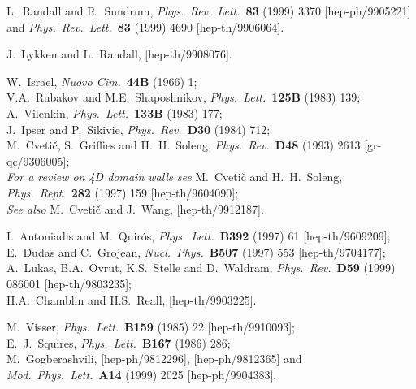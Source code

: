 \documentclass[a4paper,12pt]{article}
\begin{document}
\begin{thebibliography}{99}
L.~Randall and R.~Sundrum,
{\it Phys.\ Rev.\ Lett.}\  {\bf 83} (1999) 3370
[hep-ph/9905221]
and
{\it Phys.\ Rev.\ Lett.}\  {\bf 83} (1999) 4690
[hep-th/9906064].

J.~Lykken and L.~Randall,
[hep-th/9908076].

W.~Israel,
{\it Nuovo Cim.}\ {\bf 44B} (1966) 1;\\
%
V.A.~Rubakov and M.E.~Shaposhnikov,
{\it Phys.\ Lett.}\ {\bf 125B} (1983) 139;\\
%
A.~Vilenkin,
{\it Phys.\ Lett.}\ {\bf 133B} (1983) 177;\\
%
J.~Ipser and P.~Sikivie,
{\it Phys.\ Rev.}\ {\bf D30} (1984) 712;\\
%
M.~Cveti{\v c}, S.~Griffies and H.~H.~Soleng,
{\it Phys.\ Rev.}\  {\bf D48} (1993) 2613
[gr-qc/9306005];\\
%
{\it For a review on 4D domain walls see}
M.~Cveti{\v c} and H.~H.~Soleng,
{\it Phys.\ Rept.}\  {\bf 282} (1997) 159
[hep-th/9604090];\\
%
{\it See also } 
M.~Cveti{\v c} and J.~Wang,
[hep-th/9912187].

I.~Antoniadis and M.~Quir\'os,
{\it Phys.\ Lett.}\  {\bf B392} (1997) 61
[hep-th/9609209];\\
%
E.~Dudas and C.~Grojean,
{\it Nucl.\ Phys.}\  {\bf B507} (1997) 553
[hep-th/9704177];\\
%
A.~Lukas, B.A.~Ovrut, K.S.~Stelle and D.~Waldram,
{\it Phys.\ Rev.}\ {\bf D59} (1999) 086001
[hep-th/9803235];\\
%
H.A.~Chamblin and H.S.~Reall,
[hep-th/9903225].


M.~Visser,
{\it Phys.\ Lett.}\  {\bf B159} (1985) 22
[hep-th/9910093];\\
%
E.~J.~Squires,
{\it Phys.\ Lett.}\  {\bf B167} (1986) 286;\\
%
M.~Gogberashvili,
[hep-ph/9812296], [hep-ph/9812365] and
{\it Mod.\ Phys.\ Lett.}\  {\bf A14} (1999) 2025
[hep-ph/9904383].




\end{thebibliography}
\end{document}
